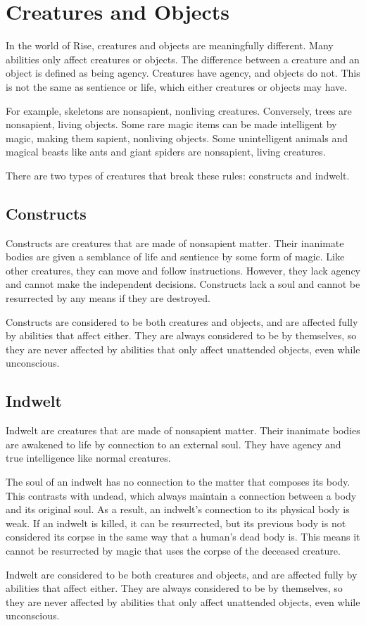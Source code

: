 \section{Creatures and Objects}
    In the world of Rise, creatures and objects are meaningfully different.
    Many abilities only affect creatures or objects.
    The difference between a creature and an object is defined as being agency.
    Creatures have agency, and objects do not.
    This is not the same as sentience or life, which either creatures or objects may have.

    For example, skeletons are nonsapient, nonliving creatures.
    Conversely, trees are nonsapient, living objects.
    Some rare magic items can be made intelligent by magic, making them sapient, nonliving objects.
    Some unintelligent animals and magical beasts like ants and giant spiders are nonsapient, living creatures.

    There are two types of creatures that break these rules: constructs and indwelt.

    \subsection{Constructs}\label{Constructs}
        Constructs are creatures that are made of nonsapient matter.
        Their inanimate bodies are given a semblance of life and sentience by some form of magic.
        Like other creatures, they can move and follow instructions.
        However, they lack agency and cannot make the independent decisions.
        Constructs lack a soul and cannot be resurrected by any means if they are destroyed.

        Constructs are considered to be both creatures and objects, and are affected fully by abilities that affect either.
        They are always considered to be  by themselves, so they are never affected by abilities that only affect unattended objects, even while unconscious.

    \subsection{Indwelt}\label{Indwelt}
        Indwelt are creatures that are made of nonsapient matter.
        Their inanimate bodies are awakened to life by connection to an external soul.
        They have agency and true intelligence like normal creatures.

        The soul of an indwelt has no connection to the matter that composes its body.
        This contrasts with undead, which always maintain a connection between a body and its original soul.
        As a result, an indwelt's connection to its physical body is weak.
        If an indwelt is killed, it can be resurrected, but its previous body is not considered its corpse in the same way that a human's dead body is.
        This means it cannot be resurrected by magic that uses the corpse of the deceased creature.

        Indwelt are considered to be both creatures and objects, and are affected fully by abilities that affect either.
        They are always considered to be  by themselves, so they are never affected by abilities that only affect unattended objects, even while unconscious.
